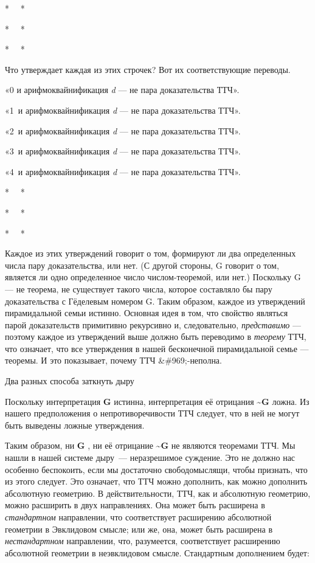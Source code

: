 \documentclass[../main.tex]{subfiles}
\begin{document}
*~~ *

*~~ *

*~~ *

Что утверждает каждая из этих строчек? Вот их соответствующие переводы.

«0 и арифмоквайнификация \emph{d} --- не пара доказательства ТТЧ».

«1~и арифмоквайнификация \emph{d} --- не пара доказательства ТТЧ».

«2~и арифмоквайнификация \emph{d} --- не пара доказательства ТТЧ».

«3~и арифмоквайнификация \emph{d} --- не пара доказательства ТТЧ».

«4~и арифмоквайнификация \emph{d} --- не пара доказательства ТТЧ».

*~~ *

*~~ *

*~~ *

Каждое из этих утверждений говорит о том, формируют ли два определенных числа пару доказательства, или нет. (С другой стороны, G говорит о том, является ли одно определенное число числом-теоремой, или нет.) Поскольку G --- не теорема, не существует такого числа, которое составляло бы пару доказательства с Гёделевым номером G. Таким образом, каждое из утверждений пирамидальной семьи истинно. Основная идея в том, что свойство являться парой доказательств примитивно рекурсивно и, следовательно, \emph{представимо} --- поэтому каждое из утверждений выше должно быть переводимо в \emph{теорему} ТТЧ, что означает, что все утверждения в нашей бесконечной пирамидальной семье --- теоремы. И это показывает, почему ТТЧ \&\#969;-неполна.

Два разных способа заткнуть дыру

Поскольку интерпретация \textbf{G} истинна, интерпретация её отрицания \textbf{\textasciitilde G} ложна. Из нашего предположения о непротиворечивости ТТЧ следует, что в ней не могут быть выведены ложные утверждения.

Таким образом, ни \textbf{G} , ни её отрицание \textbf{\textasciitilde G} не являются теоремами ТТЧ\@. Мы нашли в нашей системе дыру~--- неразрешимое суждение. Это не должно нас особенно беспокоить, если мы достаточно свободомыслящи, чтобы признать, что из этого следует. Это означает, что ТТЧ можно дополнить, как можно дополнить абсолютную геометрию. В действительности, ТТЧ, как и абсолютную геометрию, можно расширить в двух направлениях. Она может быть расширена в \emph{стандартном} направлении, что соответствует расширению абсолютной геометрии в Эвклидовом смысле; или же, она, может быть расширена в \emph{нестандартном} направлении, что, разумеется, соответствует расширению абсолютной геометрии в неэвклидовом смысле. Стандартным дополнением будет:
\end{document}
